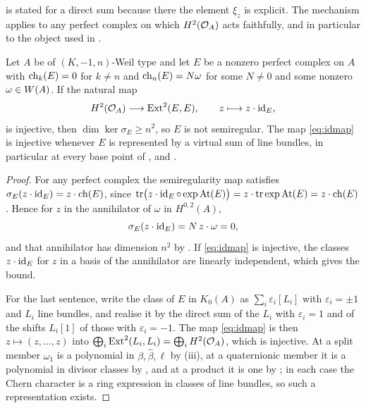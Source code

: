  is stated for a direct sum because there the element
$\xi_{z}$ is explicit. The mechanism applies to any perfect complex on which
$H^{2}(\mathcal{O}_{A})$ acts faithfully, and in particular to the object used in
.

\begin{proposition}
\label{prop:concentrated}
Let $A$ be of $(K,-1,n)$-Weil type and let $E$ be a nonzero perfect complex on
$A$ with $\operatorname{ch}_{k}(E)=0$ for $k\ne n$ and $\operatorname{ch}_{n}(E)=N\omega$ for some
$N\ne0$ and some nonzero $\omega\in W(A)$. If the natural map
\begin{equation}\label{eq:idmap}
  H^{2}(\mathcal{O}_{A})\longrightarrow\operatorname{Ext}^{2}(E,E),\qquad z\longmapsto z\cdot\operatorname{id}_{E},
\end{equation}
is injective, then $\dim\ker\sigma_{E}\ge n^{2}$, so $E$ is not semiregular.
The map \eqref{eq:idmap} is injective whenever $E$ is represented by a virtual
sum of line bundles, in particular at every base point of
,  and .
\end{proposition}

\begin{proof}
For any perfect complex the semiregularity map satisfies
$\sigma_{E}(z\cdot\operatorname{id}_{E})=z\cdot\operatorname{ch}(E)$, since
$\operatorname{tr}\bigl(z\cdot\operatorname{id}_{E}\circ\exp\mathrm{At}(E)\bigr)
=z\cdot\operatorname{tr}\exp\mathrm{At}(E)=z\cdot\operatorname{ch}(E)$. Hence for $z$ in the
annihilator of $\omega$ in $H^{0,2}(A)$,
\[
  \sigma_{E}(z\cdot\operatorname{id}_{E})=N\,z\cdot\omega=0 ,
\]
and that annihilator has dimension $n^{2}$ by . If
\eqref{eq:idmap} is injective, the classes $z\cdot\operatorname{id}_{E}$ for $z$ in a basis
of the annihilator are linearly independent, which gives the bound.

For the last sentence, write the class of $E$ in $K_{0}(A)$ as
$\sum_{i}\varepsilon_{i}[L_{i}]$ with $\varepsilon_{i}=\pm1$ and $L_{i}$ line
bundles, and realise it by the direct sum of the $L_{i}$ with
$\varepsilon_{i}=1$ and of the shifts $L_{i}[1]$ of those with
$\varepsilon_{i}=-1$. The map \eqref{eq:idmap} is then $z\mapsto(z,\dots,z)$
into $\bigoplus_{i}\operatorname{Ext}^{2}(L_{i},L_{i})=\bigoplus_{i}H^{2}(\mathcal{O}_{A})$, which is
injective. At a split member $\omega_{1}$ is a polynomial in
$\beta,\widehat\beta,\ell$ by (iii), at a quaternionic
member it is a polynomial in divisor classes by , and at a
product it is one by ; in each case the Chern character is a
ring expression in classes of line bundles, so such a representation exists.
\end{proof}

